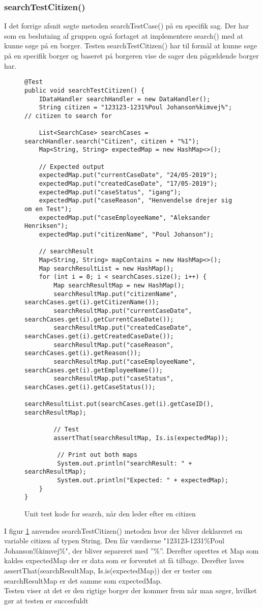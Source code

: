 \subsubsection{searchTestCitizen()}
I det forrige  afsnit søgte metoden searchTestCase() på en specifik sag. Der har som en beslutning af gruppen også fortaget at implementere search() med at kunne søge på en borger. Testen searchTestCitizen() har til formål at kunne søge på en specifik borger og baseret på borgeren vise de sager den pågældende borger har. \\
\begin{figure}
\begin{lstlisting}
@Test
public void searchTestCitizen() {
	IDataHandler searchHandler = new DataHandler();
	String citizen = "123123-1231%Poul Johanson%kimvej%"; // citizen to search for
	
	List<SearchCase> searchCases = searchHandler.search("Citizen", citizen + "%1"); 
	Map<String, String> expectedMap = new HashMap<>();
	
	// Expected output
	expectedMap.put("currentCaseDate", "24/05-2019");
	expectedMap.put("createdCaseDate", "17/05-2019");
	expectedMap.put("caseStatus", "igang");
	expectedMap.put("caseReason", "Henvendelse drejer sig om en Test");
	expectedMap.put("caseEmployeeName", "Aleksander Henriksen");
	expectedMap.put("citizenName", "Poul Johanson");
    
    // searchResult
    Map<String, String> mapContains = new HashMap<>();
    Map searchResultList = new HashMap();
    for (int i = 0; i < searchCases.size(); i++) {
    	Map searchResultMap = new HashMap();
    	searchResultMap.put("citizenName", searchCases.get(i).getCitizenName());
    	searchResultMap.put("currentCaseDate", searchCases.get(i).getCurrentCaseDate());
    	searchResultMap.put("createdCaseDate", searchCases.get(i).getCreatedCaseDate());
    	searchResultMap.put("caseReason", searchCases.get(i).getReason());
    	searchResultMap.put("caseEmployeeName", searchCases.get(i).getEmployeeName());
    	searchResultMap.put("caseStatus", searchCases.get(i).getCaseStatus());
    	searchResultList.put(searchCases.get(i).getCaseID(), searchResultMap);
    	
    	// Test
    	assertThat(searchResultMap, Is.is(expectedMap));
    	
    	 // Print out both maps
    	 System.out.println("searchResult: " + searchResultMap);
    	 System.out.println("Expected: " + expectedMap);
	}
}

\end{lstlisting}
\caption{Unit test kode for search, når den leder efter en citizen}
\label{kode:searchcitizen}
\end{figure}
I figur \ref{kode:searchcitizen} anvendes searchTestCitizen() metoden hvor der bliver deklareret en variable citizen af typen String. Den får værdierne "123123-1231\%Poul Johanson\%kimvej\%", der bliver separeret med ”\%”. Derefter oprettes et Map som kaldes expectedMap der er data som er forventet at få tilbage. Derefter laves assertThat(searchResultMap, Is.is(expectedMap)) der er tester om searchResultMap er det samme som expectedMap. \\
Testen viser at det er den rigtige borger der kommer frem når man søger, hvilket gør at testen er succesfuldt 
